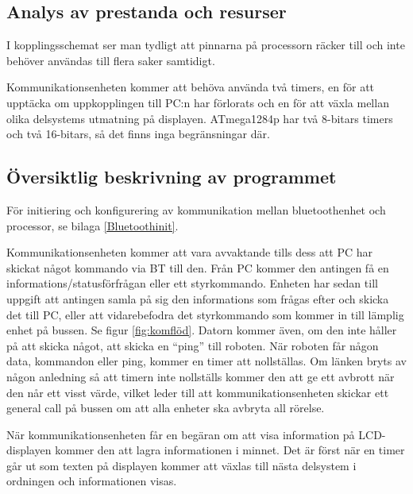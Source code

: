 \subsection{Analys av prestanda och resurser}

I kopplingsschemat ser man tydligt att pinnarna på processorn räcker till och inte behöver användas till flera saker samtidigt. 

Kommunikationsenheten kommer att behöva använda två timers, en för att upptäcka om uppkopplingen till PC:n har förlorats och en för att växla mellan olika delsystems utmatning på displayen. ATmega1284p har två 8-bitars timers och två 16-bitars, så det finns inga begränsningar där.

\subsection{Översiktlig beskrivning av programmet}

För initiering och konfigurering av kommunikation mellan bluetoothenhet och processor, se bilaga \ref{Bluetoothinit}.

Kommunikationsenheten kommer att vara avvaktande tills dess att PC har skickat något kommando via BT till den. Från PC kommer den antingen få en informations/statusförfrågan eller ett styrkommando. Enheten har sedan till uppgift att antingen samla på sig den informations som frågas efter och skicka det till PC, eller att vidarebefodra det styrkommando som kommer in till lämplig enhet på bussen. Se figur \ref{fig:komflöd}.
Datorn kommer även, om den inte håller på att skicka något, att skicka en “ping” till roboten. När roboten får någon data, kommandon eller ping, kommer en timer att nollställas. Om länken bryts av någon anledning så att timern inte nollställs kommer den att ge ett avbrott när den når ett visst värde, vilket leder till att kommunikationsenheten skickar ett general call på bussen om att alla enheter ska avbryta all rörelse.

När kommunikationsenheten får en begäran om att visa information på LCD-displayen kommer den att lagra informationen i minnet. Det är först när en timer går ut som texten på displayen kommer att växlas till nästa delsystem i ordningen och informationen visas.

